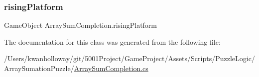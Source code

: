 \mbox{\label{class_array_sum_completion_aede79dd24168cb27103df95c78a78abf}} 
\subsubsection{\texorpdfstring{rising\+Platform}{risingPlatform}}
{\footnotesize\ttfamily Game\+Object Array\+Sum\+Completion.\+rising\+Platform}



The documentation for this class was generated from the following file\+:\begin{DoxyCompactItemize}
\item 
/\+Users/kwanholloway/git/5001\+Project/\+Game\+Project/\+Assets/\+Scripts/\+Puzzle\+Logic/\+Array\+Sumation\+Puzzle/\hyperlink{_array_sum_completion_8cs}{Array\+Sum\+Completion.\+cs}\end{DoxyCompactItemize}
